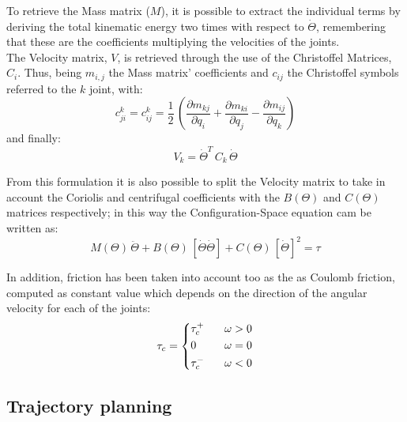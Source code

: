 \documentclass[main.tex]{subfiles}
\begin{document}
To retrieve the Mass matrix ($M$), it is possible to extract the individual terms by deriving the total kinematic energy two times with respect to $\dot{\Theta}$, remembering that these are the coefficients multiplying the velocities of the joints.\\

The Velocity matrix, $V$, is retrieved through the use of the Christoffel Matrices, $C_i$. Thus, being $m_{i,j}$ the Mass matrix' coefficients and $c_{ij}$ the Christoffel symbols referred to the $k$ joint, with:
$$c_{ji}^k=c_{ij}^k=\frac{1}{2}\,\left(\dfrac{\partial{m_{kj}}}{\partial{q_i}}+\dfrac{\partial{m_{ki}}}{\partial{q_j}}-\dfrac{\partial{m_{ij}}}{\partial{q_k}}\right)$$
and finally:
$$V_k = \dot{\Theta}^{T}\,C_k\,\dot{\Theta}$$

From this formulation it is also possible to split the Velocity matrix to take in account the Coriolis and centrifugal coefficients with the $B(\Theta)$ and $C(\Theta)$ matrices respectively; in this way the Configuration-Space equation cam be written as:
$$M(\Theta)\,\ddot{\Theta}+B(\Theta)\,[\dot{\Theta}\dot{\Theta}]+C(\Theta)\,[\dot{\Theta}]^2=\tau$$

In addition, friction has been taken into account too as the as Coulomb friction, computed as constant value which depends on the direction of the angular velocity for each of the joints:
\begin{equation}
    \centering
    \tau_c = 
    \left\{\begin{split} 
     &\tau_c^+  \;\;\; &&\omega>0  \\
     &0 \;\;\;  &&\omega=0   \\
     &\tau_c^- \;\;\; &&\omega<0 
      \end{split}\right.
\end{equation}


\subsection{Trajectory planning}
\end{document}
